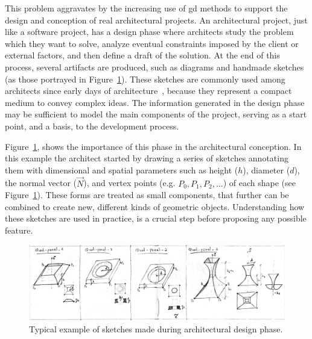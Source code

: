 This problem aggravates by the increasing use of \gls{gd} methods to support the design and conception of real architectural projects. An architectural project, just like a software project, has a design phase where architects study the problem which they want to solve, analyze eventual constraints imposed by the client or external factors, and then define a draft of the solution. At the end of this process, several artifacts are produced, such as diagrams and handmade sketches (as those portrayed in Figure~\ref{fig:sketch-fig}). These sketches are commonly used among architects since early days of architecture~\citep{do2001thinking}, because they represent a compact medium to convey complex ideas. The information generated in the design phase may be sufficient to model the main components of the project, serving as a start point, and a basis, to the development process. 

Figure~\ref{fig:sketch-fig}, shows the importance of this phase in the architectural conception. In this example the architect started by drawing a series of sketches annotating them with dimensional and spatial parameters such as height ($h$), diameter ($d$), the normal vector ($\vec{N}$), and vertex points (e.g. $P_0, P_1, P_2, ...$) of each shape (see Figure~\ref{fig:sketch-fig}). These forms are treated as small components, that further can be combined to create new, different kinds of geometric objects. Understanding how these sketches are used in practice, is a crucial step before proposing any possible feature.

\begin{figure}[!h]
  \centering
  \includegraphics[width=1\textwidth]{images/real-sketch}
    \caption{Typical example of sketches made during architectural design phase.}
  \label{fig:sketch-fig}
\end{figure}


